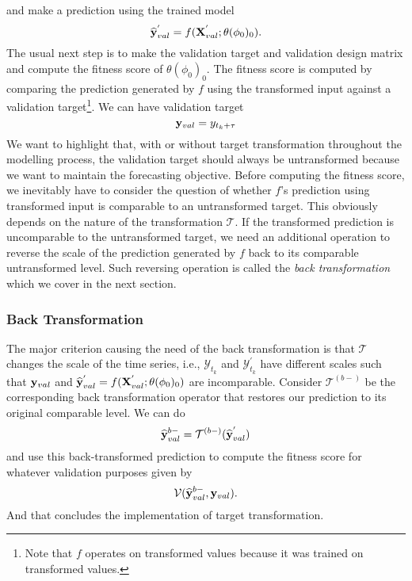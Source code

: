 and make a prediction using the trained model
\begin{equation*}
    \widehat{\mathbf{y}}^{'}_{val} = f(\mathbf{X}^{'}_{val} ; \theta(\phi_0)_0).
\end{equation*}
The usual next step is to make the validation target and validation design matrix and compute the fitness score of $\theta(\phi_0)_0$. The fitness score is computed by comparing the prediction generated by $f$ using the transformed input against a validation target\footnote{Note that $f$ operates on transformed values because it was trained on transformed values.}. We can have validation target
\begin{equation*}
    \mathbf{y}_{val} = y_{t_k + \tau}
\end{equation*}
We want to highlight that, with or without target transformation throughout the modelling process, the validation target should always be untransformed because we want to maintain the forecasting objective. Before computing the fitness score, we inevitably have to consider the question of whether $f$'s prediction using transformed input is comparable to an untransformed target. This obviously depends on the nature of the transformation $\mathcal{T}$. If the transformed prediction is uncomparable to the untransformed target, we need an additional operation to reverse the scale of the prediction generated by $f$ back to its comparable untransformed level. Such reversing operation is called the \textit{back transformation} which we cover in the next section.

\subsubsection{Back Transformation}
The major criterion causing the need of the back transformation is that $\mathcal{T}$ changes the scale of the time series, i.e., $\mathcal{Y}_{t_k}$ and $\mathcal{Y}^{'}_{t_k}$ have different scales such that $\mathbf{y}_{val}$ and $\widehat{\mathbf{y}}^{'}_{val} = f(\mathbf{X}^{'}_{val};\theta(\phi_0)_0)$ are incomparable. Consider $\mathcal{T}^{(b-)}$ be the corresponding back transformation operator that restores our prediction to its original comparable level. We can do
\begin{equation*}
    \widehat{\mathbf{y}}^{b-}_{val} = \mathcal{T}^{(b-)}(\widehat{\mathbf{y}}^{'}_{val})
\end{equation*}
and use this back-transformed prediction to compute the fitness score for whatever validation purposes given by
\begin{equation*}
    \mathcal{V}(\widehat{\mathbf{y}}^{b-}_{val}, \mathbf{y}_{val}).
\end{equation*}
And that concludes the implementation of target transformation.

